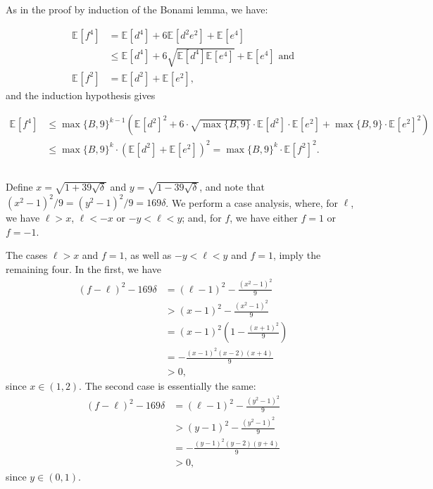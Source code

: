 \documentclass[12pt]{article}
\newcommand{\E}[2][]{\mathbb E_{#1}\left[#2\right]}
\newcommand{\set}[1]{\{#1\}}
\begin{document}
\subsection{}
As in the proof by induction of the Bonami lemma, we have:

\begin{align*}
    \E{f^4} &= \E{d^4} + 6 \E{d^2 e^2} + \E{e^4}\\
    &\leq \E{d^4} + 6 \sqrt{\E{d^4} \E{e^4}} + \E{e^4} \text{ and}\\
    \E{f^2} &= \E{d^2} + \E{e^2},
\end{align*}
and the induction hypothesis gives
    
\begin{align*}
    \E{f^4} &\leq \max\set{B,9}^{k-1}\left(\E{d^2}^2 + 6 \cdot \sqrt{\max\set{B,9}} \cdot \E{d^2} \cdot \E{e^2} + \max\set{B,9} \cdot \E{e^2}^2\right)\\
    &\leq \max\set{B,9}^k \cdot \left(\E{d^2} + \E{e^2}\right)^2 = \max\set{B,9}^k \cdot \E{f^2}^2.
\end{align*}

\subsection{}
Define $x = \sqrt{1 + 39 \sqrt{\delta}}$ and $y = \sqrt{1 - 39 \sqrt{\delta}}$, and note that $(x^2 - 1)^2/9 = (y^2 - 1)^2/9 = 169 \delta$. We perform a case analysis, where, for $\ell$, we have $\ell > x$, $\ell < -x$ or $-y < \ell < y$; and, for $f$, we have either $f = 1$ or $f = -1$.

The cases $\ell > x$ and $f = 1$, as well as $-y < \ell < y$ and $f = 1$, imply the remaining four. In the first, we have
\begin{align*}
    (f - \ell)^2 - 169 \delta &= (\ell - 1)^2 - \frac{(x^2 - 1)^2}{9}\\
    &> (x - 1)^2 - \frac{(x^2 - 1)^2}{9}\\
    &= (x - 1)^2 \left(1 - \frac{(x + 1)^2}{9}\right)\\
    &= - \frac{(x - 1)^2 (x - 2) (x + 4)}{9}\\
    &> 0,
\end{align*}
since $x \in (1,2)$. The second case is essentially the same:
\begin{align*}
    (f - \ell)^2 - 169 \delta &= (\ell - 1)^2 - \frac{(y^2 - 1)^2}{9}\\
    &> (y - 1)^2 - \frac{(y^2 - 1)^2}{9}\\
    &= - \frac{(y - 1)^2 (y - 2) (y + 4)}{9}\\
    &> 0,
\end{align*}
since $y \in (0,1)$.
\end{document}
